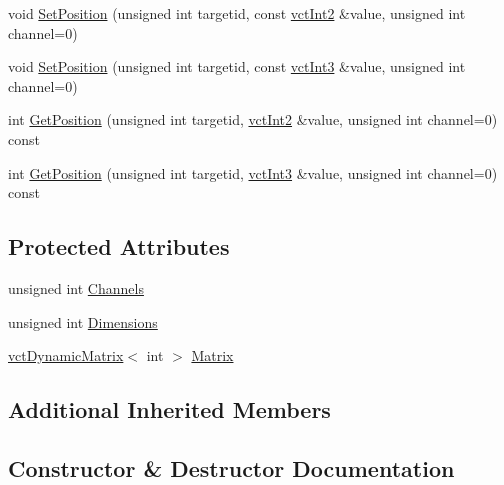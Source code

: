 \begin{DoxyCompactItemize}
\item 
void \hyperlink{classsvl_sample_targets_ab78af6a91d27d04bef57a5c259a12c45}{Set\+Position} (unsigned int targetid, const \hyperlink{vct_fixed_size_vector_types_8h_add8c88eb6a432b15f14b866b9c35325f}{vct\+Int2} \&value, unsigned int channel=0)
\item 
void \hyperlink{classsvl_sample_targets_a1b59350c466ac5d3b23c193859851631}{Set\+Position} (unsigned int targetid, const \hyperlink{vct_fixed_size_vector_types_8h_a40c5371f8f2d132b1fa17450428d213f}{vct\+Int3} \&value, unsigned int channel=0)
\item 
int \hyperlink{classsvl_sample_targets_a1199ccd908cc4eafa8d8d6ebae94987c}{Get\+Position} (unsigned int targetid, \hyperlink{vct_fixed_size_vector_types_8h_add8c88eb6a432b15f14b866b9c35325f}{vct\+Int2} \&value, unsigned int channel=0) const 
\item 
int \hyperlink{classsvl_sample_targets_aba5abd4a1d01a920ba2014be7d681dff}{Get\+Position} (unsigned int targetid, \hyperlink{vct_fixed_size_vector_types_8h_a40c5371f8f2d132b1fa17450428d213f}{vct\+Int3} \&value, unsigned int channel=0) const 
\end{DoxyCompactItemize}
\subsection*{Protected Attributes}
\begin{DoxyCompactItemize}
\item 
unsigned int \hyperlink{classsvl_sample_targets_a2abdd733857b806aac8d3340dfb51c47}{Channels}
\item 
unsigned int \hyperlink{classsvl_sample_targets_aefc5e0137cd9dfee5611532f336610bf}{Dimensions}
\item 
\hyperlink{classvct_dynamic_matrix}{vct\+Dynamic\+Matrix}$<$ int $>$ \hyperlink{classsvl_sample_targets_ae0bfb3f3979168e88f318894f4439764}{Matrix}
\end{DoxyCompactItemize}
\subsection*{Additional Inherited Members}


\subsection{Constructor \& Destructor Documentation}
\hypertarget{classsvl_sample_targets_ac9f921451c1dfbce6bad501aaad97c68}{}

